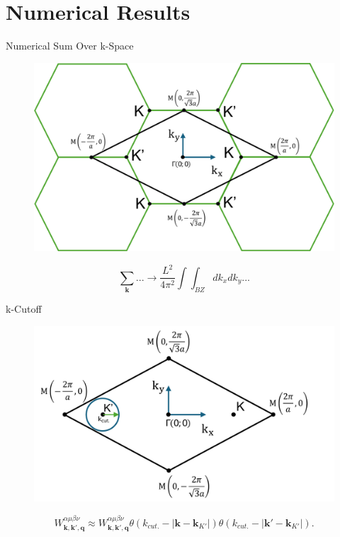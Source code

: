 \documentclass{beamer}
\begin{document}
\section{Numerical Results}
	\begin{frame}{Numerical Sum Over k-Space}
		\begin{figure}
\includegraphics[width=0.5\linewidth]{images/Rhombus.pdf}
\end{figure}
		\begin{equation}
			\sum_{\textbf{k}} ... \to \frac{L^2}{4\pi^2} \int \int_{BZ} dk_x dk_y...
		\end{equation}
	\end{frame}
	\begin{frame}{k-Cutoff}
	\begin{figure}		
		\includegraphics[width=0.75\linewidth]{images/kcutoff.pdf}
	\end{figure}
	\begin{equation}
		W^{\alpha \mu \beta \nu}_{\textbf{k},\textbf{k}',\textbf{q}} \approx W^{\alpha \mu \beta \nu}_{\textbf{k},\textbf{k}',\textbf{q}} \theta(k_{cut.} - |\textbf{k} - \textbf{k}_{K'}|) \theta(k_{cut.} - |\textbf{k}' - \textbf{k}_{K'}|).
	\end{equation}
	\end{frame}
\end{document}
